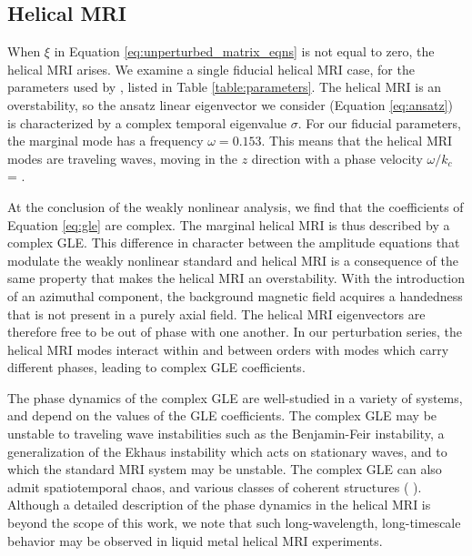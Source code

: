 \documentclass{emulateapj}
\newcommand{\citei}[1]{\citeauthor{#1} \citeyear{#1}}
\begin{document}
\subsection{Helical MRI}
\label{sec:HMRI}
When $\xi$ in Equation \ref{eq:unperturbed_matrix_eqns} is not equal to zero, the helical MRI arises. We examine a single fiducial helical MRI case, for the parameters used by \citei{Hollerbach:2005tr}, listed in Table \ref{table:parameters}. The helical MRI is an overstability, so the ansatz linear eigenvector we consider (Equation \ref{eq:ansatz}) is characterized by a complex temporal eigenvalue $\sigma$. For our fiducial parameters, the marginal mode has a frequency $\omega = 0.153$. This means that the helical MRI modes are traveling waves, moving in the $z$ direction with a phase velocity $\omega/k_c$ = .

At the conclusion of the weakly nonlinear analysis, we find that the coefficients of Equation \ref{eq:gle} are complex. The marginal helical MRI is thus described by a complex GLE. This difference in character between the amplitude equations that modulate the weakly nonlinear standard and helical MRI is a consequence of the same property that makes the helical MRI an overstability. With the introduction of an azimuthal component, the background magnetic field acquires a handedness that is not present in a purely axial field. The helical MRI eigenvectors are therefore free to be out of phase with one another. In our perturbation series, the helical MRI modes interact within and between orders with modes which carry different phases, leading to complex GLE coefficients.

The phase dynamics of the complex GLE are well-studied in a variety of systems, and depend on the values of the GLE coefficients. The complex GLE may be unstable to traveling wave instabilities such as the Benjamin-Feir instability, a generalization of the Ekhaus instability which acts on stationary waves, and to which the standard MRI system may be unstable. The complex GLE can also admit spatiotemporal chaos, and various classes of coherent structures (\citei{Aranson:2002}).
Although a detailed description of the phase dynamics in the helical MRI is beyond the scope of this work, we note that such long-wavelength, long-timescale behavior may be observed in liquid metal helical MRI experiments. 
\end{document}
